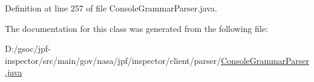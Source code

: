 Definition at line 257 of file Console\+Grammar\+Parser.\+java.



The documentation for this class was generated from the following file\+:\begin{DoxyCompactItemize}
\item 
D\+:/gsoc/jpf-\/inspector/src/main/gov/nasa/jpf/inspector/client/parser/\hyperlink{_console_grammar_parser_8java}{Console\+Grammar\+Parser.\+java}\end{DoxyCompactItemize}
